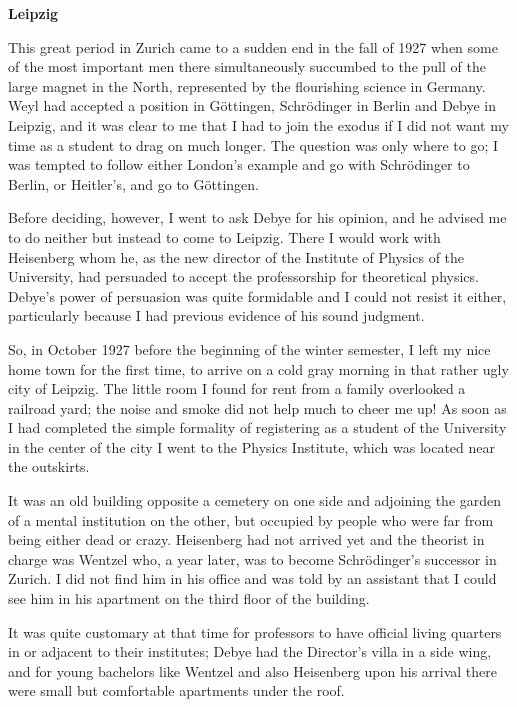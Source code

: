 \documentclass[12pt]{article}
\begin{document}
\bigskip
\noindent
{\bf Leipzig}

\smallskip
This great period in Zurich came to a sudden end in the fall of 1927 when some of the most important men there simultaneously succumbed to the pull of the large magnet in the North, represented by the flourishing science in Germany. Weyl had accepted a position in G\"ottingen, Schr\"odinger in Berlin and Debye in Leipzig, and it was clear to me that I had to join the exodus if I did not want my time as a student to drag on much longer. The question was only where to go; I was tempted to follow either London's example and go with Schr\"odinger to Berlin, or Heitler's, and go to G\"ottingen.

Before deciding, however, I went to ask Debye for his opinion, and he advised me to do neither but instead to come to
Leipzig. There I would work with Heisenberg whom he, as the new director of the Institute of Physics of the University, had persuaded to accept the professorship for theoretical physics. Debye's power of persuasion was quite formidable and I could not resist it either, particularly because I had previous evidence of his sound judgment.

So, in October 1927 before the beginning of the winter semester, I left my nice home town for the first time, to arrive on a cold gray morning in that rather ugly city of Leipzig. The little room I found for rent from a family overlooked a railroad yard; the noise and smoke did not help much to cheer me up! As soon as I had completed the simple formality of registering as a student of the University in the center of the city I went to the Physics Institute, which was located near the outskirts.

It was an old building opposite a cemetery on one side and adjoining the garden of a mental institution on the other, but occupied by people who were far from being either dead or crazy. Heisenberg had not arrived yet and the theorist in charge was Wentzel who, a year later, was to become Schr\"odinger's successor in Zurich. I did not find him in his office and was told by an assistant that I could see him in his apartment on the third floor of the building.

It was quite customary at that time for professors to have official living quarters in or adjacent to their institutes; Debye had the Director's villa in a side wing, and for young bachelors like Wentzel and also Heisenberg upon his arrival there were small but comfortable apartments under the roof.
\end{document}
